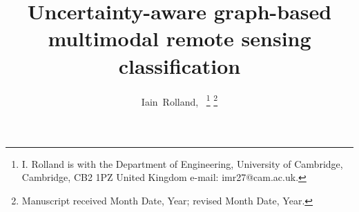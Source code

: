 \documentclass[journal]{IEEEtran}
\begin{document}
%
\title{Uncertainty-aware graph-based multimodal remote sensing classification}
%
%
%
\author{Iain~Rolland\orcidA{},~%
\thanks{I. Rolland is with the Department
of Engineering, University of Cambridge, Cambridge, CB2 1PZ United Kingdom e-mail: imr27@cam.ac.uk.}%
\thanks{Manuscript received Month Date, Year; revised Month Date, Year.}}

% 
%

%
{}
% 
\end{document}
